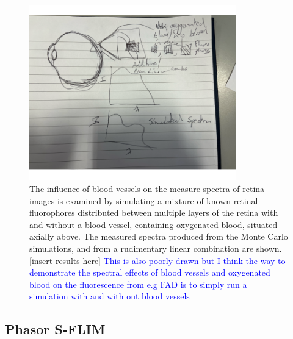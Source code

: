 \documentclass{optica-article}
\begin{document}
\begin{figure}
    \centering
    \includegraphics[width = 0.8\textwidth]{Figures/ModelValidation.png}
    \caption{The influence of blood vessels on the measure spectra of retina images is examined by simulating a mixture of known retinal fluorophores distributed between multiple layers of the retina with and without a blood vessel, containing oxygenated blood, situated axially above. The measured spectra produced from the Monte Carlo simulations, and from a rudimentary linear combination are shown.[insert results here] \textcolor{blue}{This is also poorly drawn but I think the way to demonstrate the spectral effects of blood vessels and oxygenated blood on the fluorescence from e.g FAD is to simply run a simulation with and with out blood vessels}}
    \label{fig:modelvalidation}
\end{figure}


\subsection{Phasor S-FLIM}
\end{document}
